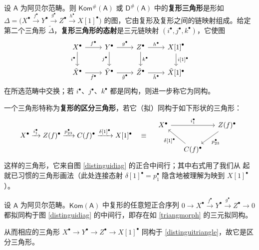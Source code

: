\begin{Def}\label{exacttriangles}
	设 $\mathsf{A}$ 为阿贝尔范畴。则 $\mathsf{Kom^\#\!(A)}$ 或 $\mathsf{D^\#\!(A)}$ 中的\textbf{复形三角形}是形如 $\Delta=\big(X^\bullet\xrightarrow{f^\bullet} Y^\bullet\xrightarrow{g^\bullet} Z^\bullet\xrightarrow{h^\bullet} X[1]^\bullet\big)$ 的图，它由复形及复形之间的链映射组成。给定第二个三角形 $\tilde{\Delta}$，\textbf{复形三角形的态射}是三元链映射 $(i^\bullet,j^\bullet,k^\bullet)$，它使图
	\begin{equation}\label{triangmorph}
		\begin{tikzcd}
			X^\bullet\arrow[r,"f^\bullet"]\arrow[d,"i^\bullet"'] & Y^\bullet\arrow[r,"g^\bullet"]\arrow[d,"j^\bullet"'] & Z^\bullet\arrow[r,"h^\bullet"]\arrow[d,"k^\bullet"] & {X[1]}^\bullet\arrow[d,"{i[1]}^\bullet"] \\
			\tilde{X}^\bullet\arrow[r,"\tilde{f}^\bullet"'] & \tilde{Y}^\bullet\arrow[r,"\tilde{g}^\bullet"'] & \tilde{Z}^\bullet\arrow[r,"\tilde{h}^\bullet"'] & \tilde{X}[1]^\bullet
		\end{tikzcd}
	\end{equation}
	在所选范畴中交换；若 $i^\bullet$、$j^\bullet$、$k^\bullet$ 都是同构，则进一步称它为同构。
	
	一个三角形特称为\textbf{复形的区分三角形}，若它（拟）同构于如下形状的三角形：
	\begin{equation}\label{distinguitriangle}
		X^\bullet\xrightarrow{i_1^\bullet} Z(f)^\bullet\xrightarrow{p_{23}^\bullet} C(f)^\bullet\xrightarrow{\delta[1]^\bullet} X[1]^\bullet
		\quad\equiv\quad
		\begin{tikzcd}[column sep=0.5cm]
			X^\bullet\arrow[rr, "i_1^\bullet"] & & Z(f)^\bullet\arrow[dl, "p_{23}^\bullet"] \\
			& C(f)^\bullet\arrow[ul, "{\delta[1]^\bullet}"]
		\end{tikzcd}
	\end{equation}
	这样的三角形，它来自图 \eqref{distinguidiag} 的正合中间行；其中右式用了我们从 \cite{[Imp21]} 起就已习惯的三角形画法（此处连接态射 $\delta[1]^\bullet=p_1^\bullet$ 隐含地被理解为映到 $X[1]^\bullet$）。
\end{Def}

\begin{Pro}\label{shortexactaretriangles}
	设 $\mathsf{A}$ 为阿贝尔范畴。$\mathsf{Kom(A)}$ 中复形的任意短正合序列 $0\rightarrow X^\bullet\xrightarrow{f^\bullet} Y^\bullet\xrightarrow{g^\bullet} Z^\bullet\rightarrow 0$ 都拟同构于图 \eqref{distinguidiag} 的中间行，即存在如 \eqref{triangmorph} 的三元拟同构。
	
	从而相应的三角形 $X^\bullet\rightarrow Y^\bullet\rightarrow Z^\bullet\rightarrow X[1]^\bullet$ 同构于 \eqref{distinguitriangle}，故它是区分三角形。  
\end{Pro}


